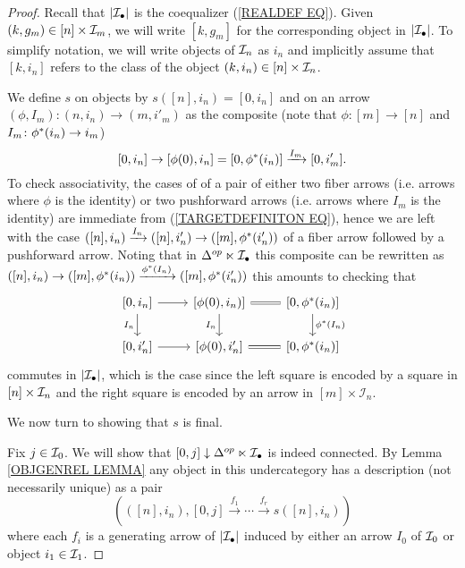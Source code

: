 \documentclass[a4paper,10pt]{article}%
\begin{document}
\begin{proof}
  Recall that $|\mathcal{I}_{\bullet}|$ is the coequalizer (\ref{REALDEF EQ}). Given $(k,g_m) \in [n] \times \mathcal{I}_m$, we will write 
  $[k,g_m]$ for the corresponding object in $|\mathcal{I}_{\bullet}|$.
  To simplify notation, we will write objects of $\mathcal{I}_n$ as $i_n$
  and implicitly assume that $[k,i_n]$ refers to the class of the object $(k,i_n) \in [n] \times \mathcal{I}_n$.


  We define $s$ on objects by 
  $s([n],i_n)=[0,i_n]$ and on an arrow 
  $(\phi,I_m)\colon (n,i_n) \to (m,i'_m)$ as the composite
  (note that $\phi\colon [m] \to [n]$ and $I_m\colon \phi^{\**}(i_n)\to i_m$)
  \begin{equation}\label{TARGETDEFINITON EQ}
    [0,i_n] \to [\phi(0),i_n] =
    [0,\phi^{\**}(i_n)]	
    \xrightarrow{I_m} 
    [0,i'_m].
  \end{equation}
  To check associativity, the cases of of a pair of either two fiber arrows (i.e. arrows where $\phi$ is the identity) or two pushforward arrows (i.e. arrows where $I_m$ is the identity) are immediate from (\ref{TARGETDEFINITON EQ}), 
  hence we are left with the case 
  $([n],i_n) \xrightarrow{I_n} ([n],i'_n) \to 
  ([m],\phi^{\**}(i'_n))$
  of a fiber arrow followed by a pushforward arrow. 
  Noting that in $\Delta^{op} \ltimes \mathcal{I}_{\bullet}$
  this composite can be rewritten as
  $([n],i_n) \to ([m],\phi^{\**}(i_n))
  \xrightarrow{\phi^{\**}(I_n)} 
  ([m],\phi^{\**}(i'_n))$
  this amounts to checking that
  \begin{equation}
    \begin{tikzcd}
      \left[0,i_n\right] \ar{r} \ar{d}[swap]{I_n} &
      \left[\phi(0),i_n) \right] \ar[equal]{r} \ar{d}[swap]{I_n} &
      \left[0,\phi^{\**}(i_n) \right] \ar{d}{\phi^{\**}(I_n)}
      \\
      \left[0,i'_n\right] \ar{r} &
      \left[\phi(0),i'_n\right] \ar[equal]{r} &
      \left[0,\phi^{\**}(i_n)\right]
    \end{tikzcd}
  \end{equation}
  commutes in $|\mathcal{I}_{\bullet}|$,
  which is the case since the left square is encoded by a square in $[n]\times \mathcal{I}_n$
  and the right square is encoded by an arrow in $[m]\times \mathcal{I}_n$.

  We now turn to showing that $s$ is final.

  Fix $j \in \mathcal{I}_0$. We will show that 
  $[0,j] \downarrow \Delta^{op} \ltimes \mathcal{I}_{\bullet}$ is indeed connected.
  By Lemma \ref{OBJGENREL LEMMA} any object 
  in this undercategory has a description (not necessarily unique) as a pair
  \[\left(\left([n],i_n\right), [0,j] \xrightarrow{f_1} \cdots \xrightarrow{f_r} s([n],i_n) \right)\]
  where each $f_i$ is a generating arrow of $|\mathcal{I}_{\bullet}|$
  induced by either an arrow $I_0$ of $\mathcal{I}_0$ or object $i_1\in \mathcal{I}_1$.


\end{proof}
\end{document}
